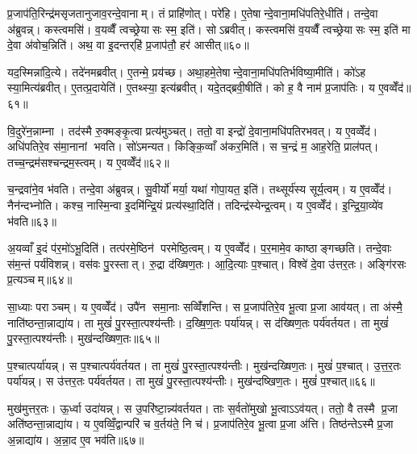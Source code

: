 प्र॒जाप॑ति॒रिन्द्र॑मसृजतानुजाव॒रन्दे॒वानाम्। तं प्राहि॑णोत्। परे॑हि। ए॒तेषान्दे॒वाना॒मधि॑पतिरे॒धीति॑। तन्दे॒वा अ॑ब्रुवन्न्। कस्त्वमसि॑। व॒यव्वैँ त्वच्छ्रेयासः स्म॒ इति॑। सोऽब्रवीत्। कस्त्वमसि॑ व॒यव्वैँ त्वच्छ्रेयासः स्म॒ इति॑ मा दे॒वा अ॑वोच॒न्निति॑। अथ॒ वा इ॒दन्तर्‌हि॑ प्र॒जाप॑तौ॒ हर॑ आसीत्॥६०॥

यद॒स्मिन्ना॑दि॒त्ये। तदे॑नमब्रवीत्। ए॒तन्मे॒ प्रय॑च्छ। अथा॒हमे॒तेषान्दे॒वाना॒मधि॑पतिर्भविष्या॒मीति॑। को॑ऽह स्या॒मित्य॑ब्रवीत्। ए॒तत्प्र॒दायेति॑। ए॒तथ्स्या॒ इत्य॑ब्रवीत्। यदे॒तद्ब्रवी॒षीति॑। को ह॒ वै नाम॑ प्र॒जाप॑तिः। य ए॒वव्वेँद॑॥६१॥

वि॒दुरे॑न॒न्नाम्ना। तद॑स्मै रु॒क्मङ्कृ॒त्वा प्रत्य॑मुञ्चत्। ततो॒ वा इन्द्रो॑ दे॒वाना॒मधि॑पतिरभवत्। य ए॒वव्वेँद॑। अधि॑पतिरे॒व स॑मा॒नानां भवति। सो॑ऽमन्यत। किङ्कि॒व्वाँ अ॑कर॒मिति॑। स च॒न्द्रं म॒ आह॒रेति॒ प्राल॑पत्। तच्च॒न्द्रम॑सश्चन्द्रम॒स्त्वम्। य ए॒वव्वेँद॑॥६२॥

च॒न्द्रवा॑ने॒व भ॑वति। तन्दे॒वा अ॑ब्रुवन्न्। सु॒वीर्यो॑ मर्या॒ यथा॑ गोपा॒यत॒ इति॑। तथ्सूर्य॑स्य सूर्य॒त्वम्। य ए॒वव्वेँद॑। नैन॑न्दभ्नोति। कश्च॒ नास्मि॒न्वा इ॒दमि॑न्द्रि॒यं प्रत्य॑स्था॒दिति॑। तदिन्द्र॑स्येन्द्र॒त्वम्। य ए॒वव्वेँद॑। इ॒न्द्रि॒या॒व्ये॑व भ॑वति॥६३॥

अ॒यव्वाँ इ॒दं प॑र॒मो॑ऽभू॒दिति॑। तत्प॑रमे॒ष्ठिन॑ परमेष्ठि॒त्वम्। य ए॒वव्वेँद॑। प॒र॒मामे॒व काष्ठाङ्गच्छति। तन्दे॒वाः स॑म॒न्तं पर्य॑विशन्न्। वस॑वः पु॒रस्तात्। रु॒द्रा द॑ख्षिण॒तः। आ॒दि॒त्याः प॒श्चात्। विश्वे॑ दे॒वा उ॑त्तर॒तः। अङ्गि॑रसः प्र॒त्यञ्चम्॥६४॥

सा॒ध्याः पराञ्चम्। य ए॒वव्वेँद॑। उपै॑न समा॒नाः सव्विँ॑शन्ति। स प्र॒जाप॑तिरे॒व भू॒त्वा प्र॒जा आव॑यत्। ता अ॑स्मै॒ नाति॑ष्ठन्ता॒न्नाद्या॑य। ता मुखं॑ पु॒रस्ता॒त्पश्य॑न्तीः। द॒ख्षि॒ण॒तः पर्या॑यन्न्। स द॑ख्षिण॒तः पर्य॑वर्तयत। ता मुखं॑ पु॒रस्ता॒त्पश्य॑न्तीः। मुख॑न्दख्षिण॒तः॥६५॥

प॒श्चात्पर्या॑यन्न्। स प॒श्चात्पर्य॑वर्तयत। ता मुखं॑ पु॒रस्ता॒त्पश्य॑न्तीः। मुख॑न्दख्षिण॒तः। मुखं॑ प॒श्चात्। उ॒त्त॒र॒तः पर्या॑यन्न्। स उ॑त्तर॒तः पर्य॑वर्तयत। ता मुखं॑ पु॒रस्ता॒त्पश्य॑न्तीः। मुख॑न्दष्खिण॒तः। मुखं॑ प॒श्चात्॥६६॥

मुख॑मुत्तर॒तः। ऊ॒र्ध्वा उदा॑यन्न्। स उ॒परि॑ष्टा॒न्न्य॑वर्तयत। ताः स॒र्वतो॑मुखो भू॒त्वाऽऽव॑यत्। ततो॒ वै तस्मै प्र॒जा अति॑ष्ठन्ता॒न्नाद्या॑य। य ए॒वव्विँ॒द्वान्परि॑ च व॒र्तय॑ते॒ नि च॑। प्र॒जाप॑तिरे॒व भू॒त्वा प्र॒जा अ॑त्ति। तिष्ठ॑न्तेऽस्मै प्र॒जा अ॒न्नाद्या॑य। अ॒न्ना॒द ए॒व भव॑ति॥६७॥\anuvakamend[आ॒सी॒द्वेद॑ चन्द्रम॒स्त्वय्यँ ए॒वव्वेँदेन्द्रिया॒व्ये॑व भ॑वति प्र॒त्यञ्चं॒ मुख॑न्दख्षिण॒तो मुखं॑ प॒श्चान्नव॑ च]

